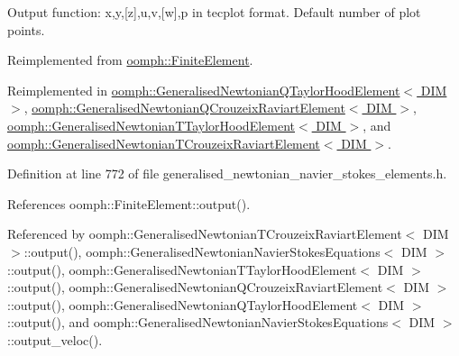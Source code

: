 Output function\+: x,y,\mbox{[}z\mbox{]},u,v,\mbox{[}w\mbox{]},p in tecplot format. Default number of plot points. 



Reimplemented from \hyperlink{classoomph_1_1FiniteElement_a2ad98a3d2ef4999f1bef62c0ff13f2a7}{oomph\+::\+Finite\+Element}.



Reimplemented in \hyperlink{classoomph_1_1GeneralisedNewtonianQTaylorHoodElement_ac1e132d67adcf473addf1d85eabd1e1c}{oomph\+::\+Generalised\+Newtonian\+Q\+Taylor\+Hood\+Element$<$ D\+I\+M $>$}, \hyperlink{classoomph_1_1GeneralisedNewtonianQCrouzeixRaviartElement_a243e373aca5dedfea4efb4d976434d3a}{oomph\+::\+Generalised\+Newtonian\+Q\+Crouzeix\+Raviart\+Element$<$ D\+I\+M $>$}, \hyperlink{classoomph_1_1GeneralisedNewtonianTTaylorHoodElement_a998c59443d1ac6472d036a5f0a839bed}{oomph\+::\+Generalised\+Newtonian\+T\+Taylor\+Hood\+Element$<$ D\+I\+M $>$}, and \hyperlink{classoomph_1_1GeneralisedNewtonianTCrouzeixRaviartElement_a483703d25945a08046f0792e0321bc59}{oomph\+::\+Generalised\+Newtonian\+T\+Crouzeix\+Raviart\+Element$<$ D\+I\+M $>$}.



Definition at line 772 of file generalised\+\_\+newtonian\+\_\+navier\+\_\+stokes\+\_\+elements.\+h.



References oomph\+::\+Finite\+Element\+::output().



Referenced by oomph\+::\+Generalised\+Newtonian\+T\+Crouzeix\+Raviart\+Element$<$ D\+I\+M $>$\+::output(), oomph\+::\+Generalised\+Newtonian\+Navier\+Stokes\+Equations$<$ D\+I\+M $>$\+::output(), oomph\+::\+Generalised\+Newtonian\+T\+Taylor\+Hood\+Element$<$ D\+I\+M $>$\+::output(), oomph\+::\+Generalised\+Newtonian\+Q\+Crouzeix\+Raviart\+Element$<$ D\+I\+M $>$\+::output(), oomph\+::\+Generalised\+Newtonian\+Q\+Taylor\+Hood\+Element$<$ D\+I\+M $>$\+::output(), and oomph\+::\+Generalised\+Newtonian\+Navier\+Stokes\+Equations$<$ D\+I\+M $>$\+::output\+\_\+veloc().

\mbox{\label{classoomph_1_1GeneralisedNewtonianNavierStokesEquations_aadb72645b2396e206fc7765114364095}} 
